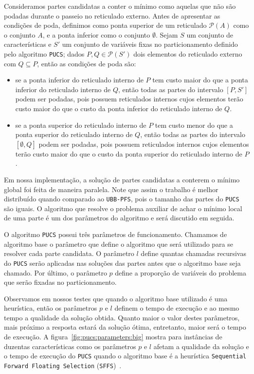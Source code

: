 \documentclass[12pt]{article}
\newcommand{\powerset}{\mathcal{P}}
\newcommand{\algname}[1]{\texttt{#1}}
\begin{document}
Consideramos partes candidatas a conter o mínimo como aquelas que não
são podadas durante o passeio no reticulado externo. Antes de 
apresentar as condições de poda, definimos como ponta superior de um
reticulado $\powerset (A)$ como o conjunto $A$, e a ponta inferior como 
o conjunto $\emptyset$. Sejam $S$ um conjunto de características e $S'$ 
um conjunto de variáveis fixas no particionamento definido pelo 
algoritmo \algname{PUCS}; dados $P, Q \in \powerset (S')$ dois 
elementos do reticulado externo com $Q \subseteq P$, então as condições
de poda são:

\begin{itemize}
\item{se a ponta inferior do reticulado interno de $P$ tem custo maior 
do que a ponta inferior do reticulado interno de $Q$, então todas as 
partes do intervalo $[P, S']$ podem ser podadas, pois possuem 
reticulados internos cujos elementos terão custo maior do que o custo da 
ponta inferior do reticulado interno de $Q$.}
\item{se a ponta superior do reticulado interno de $P$ tem custo menor
do que a ponta superior do reticulado interno de $Q$, então todas as 
partes do intervalo $[\emptyset, Q]$ podem ser podadas, pois possuem 
reticulados internos cujos elementos terão custo maior do que o custo da 
ponta superior do reticulado interno de $P$.}
\end{itemize}

Em nossa implementação, a solução de partes candidatas a conterem o 
mínimo global foi feita de maneira paralela. Note que assim o trabalho
é melhor distribuído quando comparado ao \algname{UBB-PFS}, pois o 
tamanho das partes do \algname{PUCS} são iguais. O algoritmo que resolve
o problema auxiliar de achar o mínimo local de uma parte é um dos 
parâmetros do algoritmo e será discutido em seguida.

O algoritmo \algname{PUCS} possui três parâmetros de funcionamento. 
Chamamos de algoritmo base o parâmetro que define o algoritmo que será 
utilizado para se resolver cada parte candidata. O parâmetro $l$ define
quantas chamadas recursivas do \algname{PUCS} serão aplicadas nas 
soluções das partes antes que o algoritmo base seja chamado. Por último,
o parâmetro $p$ define a proporção de variáveis do problema que serão
fixadas no particionamento.

Observamos em nossos testes que quando o algoritmo base utilizado é
uma heurística, então os parâmetros $p$ e $l$ definem o tempo de 
execução e ao mesmo tempo a qualidade da solução obtida. Quanto maior
o valor destes parâmetros, mais próximo a resposta estará da solução 
ótima, entretanto, maior será o tempo de execução. A 
figura~\ref{fig:pucs:parameters:big} mostra para instâncias de 
duzentas características como os parâmetros $p$ e $l$ afetam a qualidade
da solução e o tempo de execução do \algname{PUCS} quando o algoritmo
base é a heurística \algname{Sequential Forward Floating Selection} 
(\algname{SFFS})~\cite{PNK94}.
\end{document}
